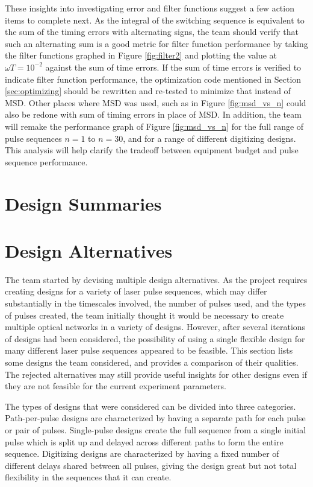 \documentclass[pdftex,12pt,a4paper]{article}
\begin{document}
These insights into investigating error and filter functions suggest a few action items to complete next. As the integral of the switching sequence is equivalent to the sum of the timing errors with alternating signs, the team should verify that such an alternating sum is a good metric for filter function performance by taking the filter functions graphed in Figure \ref{fig:filter2} and plotting the value at $\omega T = 10^{-2}$ against the sum of time errors. If the sum of time errors is verified to indicate filter function performance, the optimization code mentioned in Section \ref{sec:optimizing} should be rewritten and re-tested to minimize that instead of MSD. Other places where MSD was used, such as in Figure \ref{fig:msd_vs_n} could also be redone with sum of timing errors in place of MSD. In addition, the team will remake the performance graph of Figure \ref{fig:msd_vs_n} for the full range of pulse sequences $n=1$ to $n=30$, and for a range of different digitizing designs.  This analysis will help clarify the tradeoff between equipment budget and pulse sequence performance.


\section{Design Summaries}
\label{sec:design_summary}

\section{Design Alternatives}
\label{sec:design_alternatives}
The team started by devising multiple design alternatives. As the project requires creating designs for a variety of laser pulse sequences, which may differ substantially in the timescales involved, the number of pulses used, and the types of pulses created, the team initially thought it would be necessary to create multiple optical networks in a variety of designs. However, after several iterations of designs had been considered, the possibility of using a single flexible design for many different laser pulse sequences appeared to be feasible. This section lists some designs the team considered, and provides a comparison of their qualities. The rejected alternatives may still provide useful insights for other designs even if they are not feasible for the current experiment parameters.

	The types of designs that were considered can be divided into three categories.  Path-per-pulse designs are characterized by having a separate path for each pulse or pair of pulses. Single-pulse designs create the full sequence from a single initial pulse which is split up and delayed across different paths to form the entire sequence. Digitizing designs are characterized by having a fixed number of different delays shared between all pulses, giving the design great but not total flexibility in the sequences that it can create.
    
\end{document}

